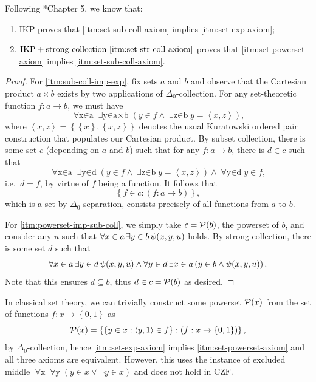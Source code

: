 \documentclass[12pt,openany]{book}
\theoremstyle{plain}
\theoremstyle{definition}
\newcommand\uplabel[1]{\textup{(#1)}}
\newcommand\tuple[1]{\left\langle #1 \right\rangle}
\newcommand\opA[1]{\mathop{\forall #1}}
\newcommand\opE[1]{\mathop{\exists #1}}
\newcommand\Pow{\mathcal{P}}
\newcommand\CZF{\mathrm{CZF}}
\newcommand\IKP{\mathrm{IKP}}
\begin{document}
Following \cite{aczel-rathjen10-cst-book}*{Chapter 5}, we know that:
\begin{proposition}
  \label{prop:ikp-exp-sub-coll-powerset}
  \begin{enumerate}[label=\uplabel{\roman*}]
    \item \label{itm:sub-coll-imp-exp} $\IKP$ proves that \ref{itm:set-sub-coll-axiom} implies \ref{itm:set-exp-axiom};
    \item \label{itm:powerset-imp-sub-coll} $\IKP + \text{strong collection \ref{itm:set-str-coll-axiom}}$ proves that \ref{itm:set-powerset-axiom} implies \ref{itm:set-sub-coll-axiom}.
  \end{enumerate}
\end{proposition}

\begin{proof}
  For \ref{itm:sub-coll-imp-exp}, fix sets $a$ and $b$ and observe that the Cartesian product $a \times b$ exists by two applications of $\Delta_0$-collection. For any set-theoretic function $f : a \rightarrow b$, we must have
  \[\opA{x \in a} \opE{y \in a \times b} \left(y \in f \land \opE{z \in b} y = \tuple{x, z}\right),\]
  where $\tuple{x, z} = \left\{\left\{x\right\}, \left\{x, z\right\}\right\}$ denotes the usual Kuratowski ordered pair construction that populates our Cartesian product. By subset collection, there is some set $c$ (depending on $a$ and $b$) such that for any $f : a \rightarrow b$, there is $d \in c$ such that
  \[\opA{x \in a} \opE{y \in d} \left(y \in f \land \opE{z \in b} y = \tuple{x, z}\right) \land \opA{y \in d} y \in f,\]
  i.e.\ $d = f$, by virtue of $f$ being a function. It follows that
  \[\left\{f \in c : \left(f : a \rightarrow b\right)\right\},\]
  which is a set by $\Delta_0$-separation, consists precisely of all functions from $a$ to $b$.

  For \ref{itm:powerset-imp-sub-coll}, we simply take $c = \Pow\mleft(b\mright)$, the powerset of $b$, and consider any $u$ such that $\opA{x \in a} \opE{y \in b} \psi\mleft(x, y, u\mright)$ holds. By strong collection, there is some set $d$ such that
  \[\opA{x \in a} \opE{y \in d} \psi\mleft(x, y, u\mright) \land \opA{y \in d} \opE{x \in a} \left(y \in b \land \psi\mleft(x, y, u\mright)\right).\]
  Note that this ensures $d \subseteq b$, thus $d \in c = \Pow\mleft(b\mright)$ as desired.
\end{proof}

In classical set theory, we can trivially construct some powerset $\Pow\mleft(x\mright)$ from the set of functions $f : x \rightarrow \left\{0, 1\right\}$ as
\[\Pow\mleft(x\mright) = \left\{\left\{y \in x : \tuple{y, 1} \in f\right\} : \left(f : x \rightarrow \left\{0, 1\right\}\right)\right\},\]
by $\Delta_0$-collection, hence \ref{itm:set-exp-axiom} implies \ref{itm:set-powerset-axiom} and all three axioms are equivalent. However, this uses the instance of excluded middle $\opA{x} \opA{y} \left(y \in x \lor \neg y \in x\right)$ and does not hold in $\CZF$.
\end{document}
